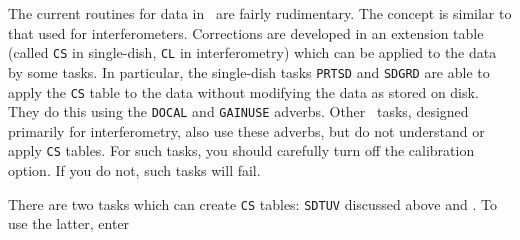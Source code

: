 
     The current  routines for 
data in \AIPS\ are fairly rudimentary.  The concept is similar to that
used for interferometers.  Corrections are developed in an extension
table (called {\tt CS} in single-dish, {\tt CL} in interferometry)
which can be applied to the data by some tasks.  In particular, the
single-dish tasks {\tt PRTSD} and {\tt SDGRD} are able to apply the
{\tt CS} table to the data without modifying the data as stored on
disk.  They do this using the {\tt DOCAL} and {\tt GAINUSE} adverbs.
Other \uv\ tasks, designed primarily for interferometry, also use
these adverbs, but do not understand or apply {\tt CS} tables.  For
such tasks, you should carefully turn off the calibration option.  If
you do not, such tasks will fail.

     There are two tasks which can create {\tt CS} tables: {\tt SDTUV}
discussed above and \hbox{{\tt {}}}.  To use the latter,
enter

